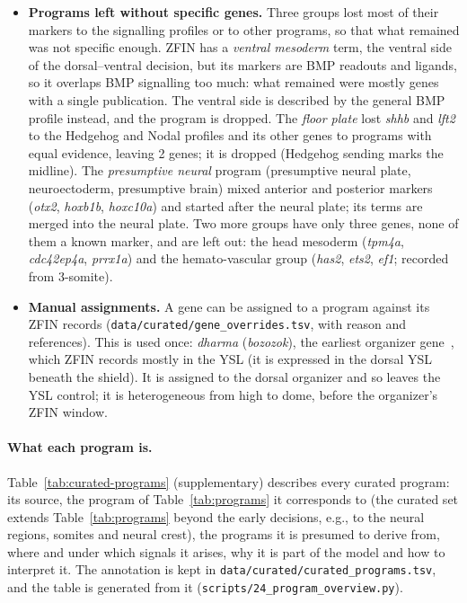\documentclass[11pt,a4paper]{article}
\begin{document}
\begin{itemize}
	Of the genes within the original limit, 91 are excluded from the anatomy programs due to a signalling, state or control program, and 188 were shared with an unrelated anatomy program, 65 of them with equal evidence (Table~\ref{tab:curated-removed}). The programs that shrank most are the primary neurons (30 to 22 genes), the intermediate mesoderm (23 to 15), the organizer, the endoderm (both 30 to 23) and the neural crest (27 to 20).
	\item \textbf{Programs left without specific genes.} Three groups lost most of their markers to the signalling profiles or to other programs, so that what remained was not specific enough. ZFIN has a \emph{ventral mesoderm} term, the ventral side of the dorsal--ventral decision, but its markers are BMP readouts and ligands, so it overlaps BMP signalling too much: what remained were mostly genes with a single publication. The ventral side is described by the general BMP profile instead, and the program is dropped. The \emph{floor plate} lost \emph{shhb} and \emph{lft2} to the Hedgehog and Nodal profiles and its other genes to programs with equal evidence, leaving 2 genes; it is dropped (Hedgehog sending marks the midline). The \emph{presumptive neural} program (presumptive neural plate, neuroectoderm, presumptive brain) mixed anterior and posterior markers (\emph{otx2}, \emph{hoxb1b}, \emph{hoxc10a}) and started after the neural plate; its terms are merged into the neural plate. Two more groups have only three genes, none of them a known marker, and are left out: the head mesoderm (\emph{tpm4a}, \emph{cdc42ep4a}, \emph{prrx1a}) and the hemato-vascular group (\emph{has2}, \emph{ets2}, \emph{ef1}; recorded from 3-somite).
	\item \textbf{Manual assignments.} A gene can be assigned to a program against its ZFIN records (\nolinkurl{data/curated/gene_overrides.tsv}, with reason and references). This is used once: \emph{dharma} (\emph{bozozok}), the earliest organizer gene~\cite{yamanaka1998}, which ZFIN records mostly in the YSL (it is expressed in the dorsal YSL beneath the shield). It is assigned to the dorsal organizer and so leaves the YSL control; it is heterogeneous from high to dome, before the organizer's ZFIN window.
\end{itemize}

\paragraph{What each program is.} Table~\ref{tab:curated-programs} (supplementary) describes every curated program: its source, the program of Table~\ref{tab:programs} it corresponds to (the curated set extends Table~\ref{tab:programs} beyond the early decisions, e.g., to the neural regions, somites and neural crest), the programs it is presumed to derive from, where and under which signals it arises, why it is part of the model and how to interpret it. The annotation is kept in \nolinkurl{data/curated/curated_programs.tsv}, and the table is generated from it (\nolinkurl{scripts/24_program_overview.py}).
\end{document}
